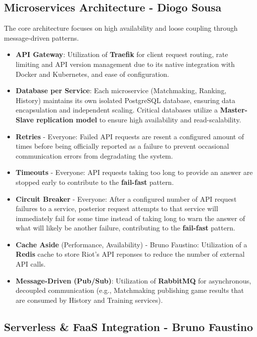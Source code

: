 \documentclass[11pt,a4paper]{article}
\newcommand{\bff}[1]{\textbf{#1}}
\begin{document}
 \subsection{Microservices Architecture - Diogo Sousa}

 The core architecture focuses on high availability and loose coupling through message-driven patterns.
 
 \begin{itemize}
  \item \bff{API Gateway}: Utilization of \bff{Traefik} for client request routing, rate limiting and API version management due to its native integration with Docker and Kubernetes, and ease of configuration.
  \item \bff{Database per Service}: Each microservice (Matchmaking, Ranking, History) maintains its own isolated PostgreSQL database, ensuring data encapsulation and independent scaling. Critical databases utilize a \bff{Master-Slave replication model} to ensure high availability and read-scalability.
  \item \bff{Retries} - Everyone: Failed API requests are resent a configured amount of times before being officially reported as a failure to prevent occasional communication errors from degradating the system.
  \item \bff{Timeouts} - Everyone: API requests taking too long to provide an answer are stopped early to contribute to the \bff{fail-fast} pattern.
  \item \bff{Circuit Breaker} - Everyone: After a configured number of API request failures to a service, posterior request attempts to that service will immediately fail for some time instead of taking long to warn the answer of what will likely be another failure, contributing to the \bff{fail-fast} pattern.
  \item \bff{Cache Aside} (Performance, Availability) - Bruno Faustino: Utilization of a \bff{Redis} cache to store Riot's API reponses to reduce the number of external API calls.
  \item \bff{Message-Driven (Pub/Sub)}: Utilization of \bff{RabbitMQ} for asynchronous, decoupled communication (e.g., Matchmaking publishing game results that are consumed by History and Training services).
 \end{itemize}
 
 \subsection{Serverless \& FaaS Integration - Bruno Faustino}
\end{document}
